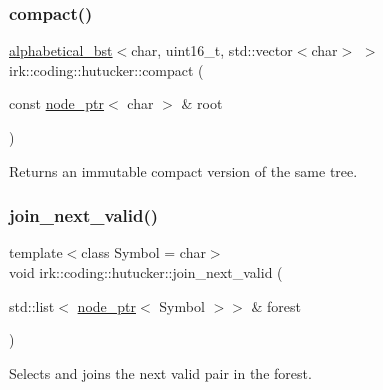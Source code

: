 \subsubsection{\texorpdfstring{compact()}{compact()}}
{\footnotesize\ttfamily \mbox{\hyperlink{classirk_1_1alphabetical__bst}{alphabetical\+\_\+bst}}$<$char, uint16\+\_\+t, std\+::vector$<$char$>$ $>$ irk\+::coding\+::hutucker\+::compact (\begin{DoxyParamCaption}\item[{const \mbox{\hyperlink{namespaceirk_1_1coding_1_1hutucker_aa5d22cfdf05ffec38f2531e0307248fe}{node\+\_\+ptr}}$<$ char $>$ \&}]{root }\end{DoxyParamCaption})\hspace{0.3cm}{\ttfamily [inline]}}



Returns an immutable compact version of the same tree. 

\mbox{\label{namespaceirk_1_1coding_1_1hutucker_ad43136697500a2cc05315ab694767d84}} 
\subsubsection{\texorpdfstring{join\+\_\+next\+\_\+valid()}{join\_next\_valid()}}
{\footnotesize\ttfamily template$<$class Symbol  = char$>$ \\
void irk\+::coding\+::hutucker\+::join\+\_\+next\+\_\+valid (\begin{DoxyParamCaption}\item[{std\+::list$<$ \mbox{\hyperlink{namespaceirk_1_1coding_1_1hutucker_aa5d22cfdf05ffec38f2531e0307248fe}{node\+\_\+ptr}}$<$ Symbol $>$$>$ \&}]{forest }\end{DoxyParamCaption})}



Selects and joins the next valid pair in the forest. 

\mbox{\label{namespaceirk_1_1coding_1_1hutucker_afc598a2671de17423c5d2c0427aab320}} 
